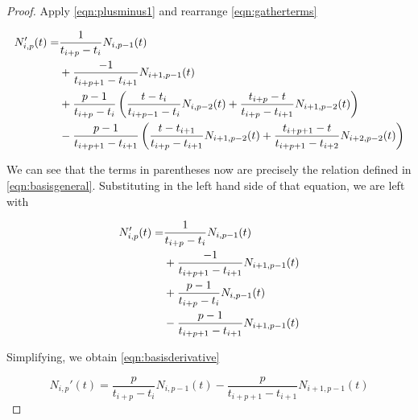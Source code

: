 \begin{appendices}
\begin{proof}
Apply \cref{eqn:plusminus1} and rearrange \cref{eqn:gatherterms}

\begin{equation}
\begin{split}
N_{i,p}'(t) =& \frac{1}{t_{i+p} - t_i} N_{i,p-1}(t)\\
& + \frac{-1}{t_{i+p+1} - t_{i+1}} N_{i+1,p-1}(t) \\ 
& + \frac{p-1}{t_{i+p} - t_i} \left( \frac{t-t_i}{t_{i+p-1}-t_i} N_{i,p-2}(t) + \frac{t_{i+p}-t}{t_{i+p}-t_{i+1}} N_{i+1,p-2}(t) \right)\\
& - \frac{p-1}{t_{i+p+1} - t_{i+1}}\left( \frac{t-t_{i+1}}{t_{i+p}-t_{i+1}} N_{i+1,p-2}(t) + \frac{t_{i+p+1}-t}{t_{i+p+1}-t_{i+2}} N_{i+2,p-2}(t) \right)
\end{split}\raisetag{3\baselineskip}
\end{equation}

We can see that the terms in parentheses now are precisely the relation defined in \cref{eqn:basisgeneral}. Substituting in the left hand side of that equation, we are left with

\begin{equation}
\begin{split}
N_{i,p}'(t) =& \frac{1}{t_{i+p} - t_i} N_{i,p-1}(t)\\
& + \frac{-1}{t_{i+p+1} - t_{i+1}} N_{i+1,p-1}(t) \\ 
& + \frac{p-1}{t_{i+p} - t_i} N_{i,p-1}(t) \\
& - \frac{p-1}{t_{i+p+1} - t_{i+1}} N_{i+1,p-1}(t)
\end{split}\raisetag{3\baselineskip}
\end{equation}

Simplifying, we obtain \cref{eqn:basisderivative}

\[
N_{i,p}'(t) = \frac{p}{t_{i+p} - t_i} N_{i,p-1}(t) - \frac{p}{t_{i+p+1} - t_{i+1}} N_{i+1,p-1}(t)
\]

\end{proof}

\end{appendices}

